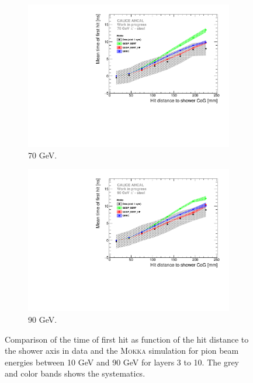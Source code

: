 \documentclass{JINST}
\newcommand\mokka{\textsc{Mokka}\xspace}
\begin{document}
\begin{figure}[htbp!]
\begin{subfigure}[t]{0.49\textwidth}
    \includegraphics[width=1\textwidth]{fig/Time_Radius_70GeV_SSF_Mokka.pdf}
    \caption{70 GeV.} \label{fig:Radius_SSF_SimData_70GeV}
  \end{subfigure}
  \hfill
  \begin{subfigure}[t]{0.49\textwidth}
    \centering
    \includegraphics[width=1\textwidth]{fig/Time_Radius_90GeV_SSF_Mokka.pdf}
    \caption{90 GeV.} \label{fig:Radius_SSF_SimData_90GeV}
  \end{subfigure}
  \caption{Comparison of the time of first hit as function of the hit distance to the shower axis in data and the \mokka simulation for pion beam energies between 10 GeV and 90 GeV for layers 3 to 10. The grey and color bands shows the systematics.}
\end{figure}
\end{document}
